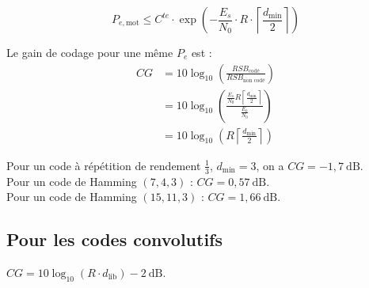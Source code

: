 	$$P_{e,\text{mot}} \leq C^{te} \cdot \exp \left( - \frac{E_s}{N_0} \cdot R \cdot \left\lceil \frac{d_{\min}}{2} \right\rceil \right)$$

	Le gain de codage pour une même $P_e$ est :
	\begin{align*}
	CG
	& = 10 \log_{10} \left( \frac{RSB_{\text{codé}}}{RSB_{\text{non codé}}} \right) \\
	& = 10 \log_{10} \left( \frac{\frac{E_s}{N_0} R \left\lceil \frac{d_{\min}}{2} \right\rceil}{\frac{E_b}{N_0}} \right) \\
	& = 10 \log_{10} \left( R \left\lceil \frac{d_{\min}}{2} \right\rceil \right)
	\end{align*}

	Pour un code à répétition de rendement $\frac{1}{3}$, $d_{\min} = 3$, on a $CG = -1{,}7\ \text{dB}$.\\
	Pour un code de Hamming $(7,4,3)$ : $CG = 0{,}57\ \text{dB}$.\\
	Pour un code de Hamming $(15,11,3)$ : $CG = 1{,}66\ \text{dB}$.


\subsection{Pour les codes convolutifs}

	$CG = 10 \log_{10}(R \cdot d_{\text{lib}}) - 2\ \text{dB}$.
